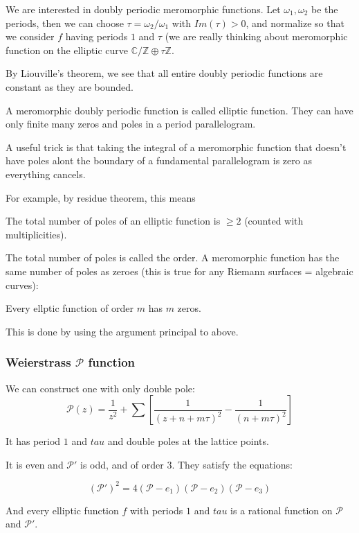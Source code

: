 \documentclass[main.tex]{subfiles}
\begin{document}
We are interested in doubly periodic meromorphic functions. Let $\omega_1, \omega_2$ be the periods, then we can choose $\tau = \omega_2/\omega_1$ with $Im(\tau)> 0$, and normalize so that we consider $f$ having periods $1$ and $\tau$ (we are really thinking about meromorphic function on the elliptic curve $\mathbb{C}/\mathbb{Z} \oplus \tau \mathbb{Z}$.

By Liouville's theorem, we see that all entire doubly periodic functions are constant as they are bounded.

A meromorphic doubly periodic function is called elliptic function. They can have only finite many zeros and poles in a period parallelogram.

A useful trick is that taking the integral of a meromorphic function that doesn't have poles alont the boundary of a fundamental parallelogram is zero as everything cancels.

For example, by residue theorem, this means 
\begin{theorem}
The total number of poles of an elliptic function is $\geq 2$ (counted with multiplicities).
\end{theorem}
The total number of poles is called the order.
A meromorphic function has the same number of poles as zeroes (this is true for any Riemann surfaces = algebraic curves):

\begin{theorem}
Every ellptic function of order $m$ has $m$ zeros.
\end{theorem}

This is done by using the argument principal to above.

\subsubsection{Weierstrass $\mathcal{P}$ function}

We can construct one with only double pole:
$$
\mathcal{P}(z) = \frac{1}{z^2} + \sum [\frac{1}{(z + n + m \tau)^2} - \frac{1}{(n + m\tau)^2}]
$$

It has period $1$ and $tau$ and double poles at the lattice points.

It is even and $\mathcal{P}'$ is odd, and of order $3$. They satisfy the equations:

\begin{theorem}
$$
(\mathcal{P}')^2 = 4(\mathcal{P} - e_1)(\mathcal{P} - e_2)(\mathcal{P} - e_3)
$$
\end{theorem}
And every elliptic function $f$ with periods $1$ and $tau$ is a rational function on $\mathcal{P}$ and $\mathcal{P'}$.
\end{document}

